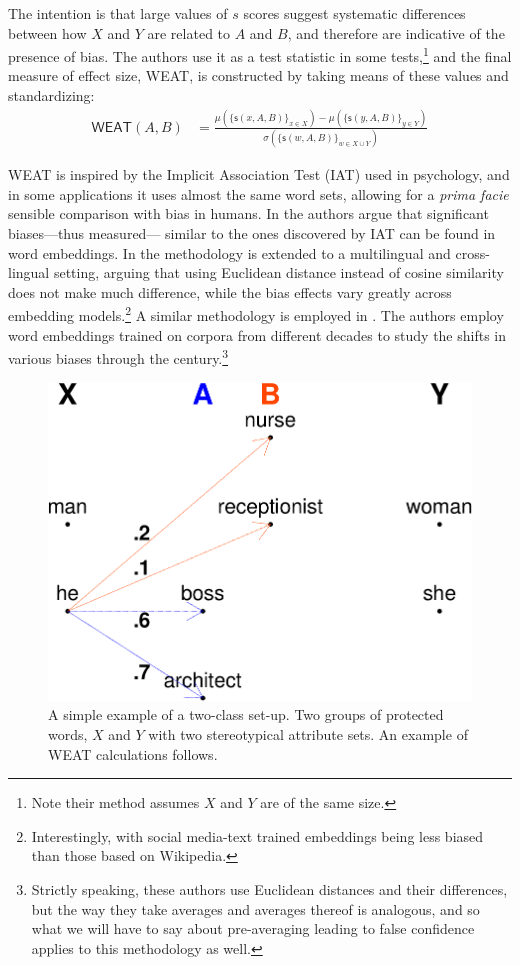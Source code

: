 \documentclass{clv3}
\begin{document}
\noindent The intention is that large values of \(s\) scores suggest
systematic differences between how \(X\) and \(Y\) are related to \(A\)
and \(B\), and therefore are indicative of the presence of bias. The
authors use it as a test statistic in some tests,\footnote{Note their
  method assumes \(X\) and \(Y\) are of the same size.} and the final
measure of effect size, \textsf{WEAT}, is constructed by taking means of
these values and standardizing: \begin{align} \label{eq:weat}
\mathsf{WEAT}(A,B) & = \frac{
\mu(\{\mathsf{s}(x,A,B)\}_{x\in X}) -\mu(\{\mathsf{s}(y,A,B)\}_{y\in Y}) 
}{
\sigma(\{\mathsf{s}(w,A,B)\}_{w\in X\cup Y})
}
\end{align}

\textsf{WEAT} is inspired by the Implicit Association Test (IAT)
\citep{Nosek2002harvesting} used in psychology, and in some applications it uses almost the
same word sets, allowing for a \emph{prima facie} sensible comparison
with bias in humans. In \citep{Caliskan2017semanticsBiases} the authors argue that significant
biases---thus measured--- similar to the ones discovered by IAT can be
found in word embeddings. In \citep{Lauscher2019multidimensional} the methodology is extended
to a multilingual and cross-lingual setting, arguing that using
Euclidean distance instead of cosine similarity does not make much
difference, while the bias effects vary greatly across embedding
models.\footnote{Interestingly, with social media-text trained
  embeddings being less biased than those based on Wikipedia.} A similar
methodology is employed in \citep{Garg2018years}. The authors employ word embeddings
trained on corpora from different decades to study the shifts in various
biases through the century.\footnote{Strictly speaking, these authors
  use Euclidean distances and their differences, but the way they take
  averages and averages thereof is analogous, and so what we will have
  to say about pre-averaging leading to false confidence applies to this
  methodology as well.}

\begin{figure}

\begin{center}\includegraphics[width=0.55\linewidth]{figures/WEATexample5} \end{center}
\caption{A simple example of a two-class set-up. Two groups of protected words, $X$ and $Y$ with two stereotypical attribute sets. An example of \textsf{WEAT} calculations follows.}
\label{eq:WEATexample}
\end{figure}
\end{document}
